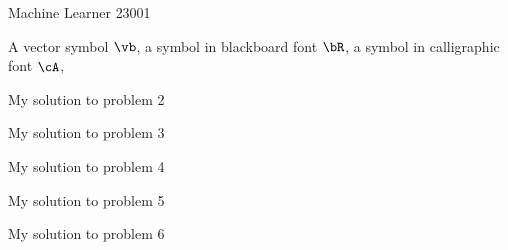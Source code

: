 \documentclass[a4paper,11pt]{article}
\begin{document}
    {Machine Learner}   %
    {23001}	%

    \begin{mlsolution}

    A vector symbol $\vb$, a symbol in blackboard font $\bR$, a symbol in calligraphic font $\cA$,   


    \end{mlsolution}

    \begin{mlsolution} 

    My solution to problem 2


    \end{mlsolution}

    \begin{mlsolution}

    My solution to problem 3

    \end{mlsolution}

    \begin{mlsolution}

    My solution to problem 4

    \end{mlsolution}
        
    \begin{mlsolution}

    My solution to problem 5

    \end{mlsolution}

    \begin{mlsolution}

    My solution to problem 6

    \end{mlsolution}


    
\end{document}
